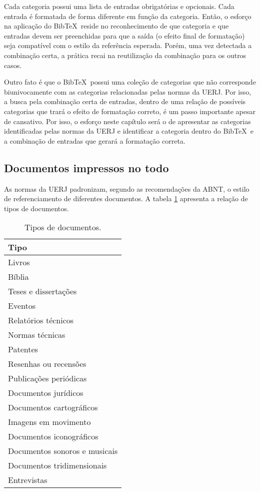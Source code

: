 \documentclass[a4paper,12pt,oneside,onecolumn]{uerj}
\newcommand{\BibTeX}{{{Bib}}\TeX}
\begin{document}
Cada categoria possui uma lista de entradas obrigatórias e opcionais. Cada entrada é formatada de forma diferente em função da categoria. Então, o esforço na aplicação do \BibTeX\ reside no reconhecimento de que categoria e que entradas devem ser preenchidas para que a saída (o efeito final de formatação) seja compatível com o estilo da referência esperada. Porém, uma vez detectada a combinação certa, a prática recai na reutilização da combinação para os outros casos.

Outro fato é que o \BibTeX\ possui uma coleção de categorias que não corresponde biunivocamente com as categorias relacionadas pelas normas da UERJ. Por isso, a busca pela combinação certa de entradas, dentro de uma relação de possíveis categorias que trará o efeito de formatação correto, é um passo importante apesar de cansativo. Por isso, o esforço neste capítulo será o de apresentar as categorias identificadas pelas normas da UERJ e identificar a categoria dentro do \BibTeX\ e a combinação de entradas que gerará a formatação correta.

\subsection{Documentos impressos no todo}

As normas da UERJ padronizam, segundo as recomendações da ABNT, o estilo de referenciamento de diferentes documentos. A tabela \ref{tab:tabela1} apresenta a relação de tipos de documentos.

\begin{table}[!ht]
  \caption{Tipos de documentos.}
  \center
  \begin{tabular}{l}
    \hline
    Tipo \\
    \hline
    Livros \\
    Bíblia \\
    Teses e dissertações \\
    Eventos \\
    Relatórios técnicos \\
    Normas técnicas \\
    Patentes \\
    Resenhas ou recensões \\
    Publicações periódicas \\
    Documentos jurídicos \\
    Documentos cartográficos \\
    Imagens em movimento \\
    Documentos iconográficos \\
    Documentos sonoros e musicais \\
    Documentos tridimensionais \\
    Entrevistas \\
    \hline
  \end{tabular}
  \label{tab:tabela1}
\end{table}
\end{document}
